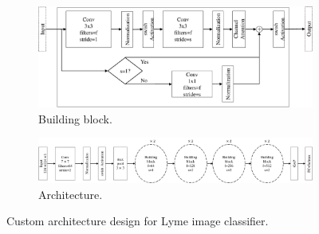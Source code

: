 \begin{figure}[htb!]
	\centering
	\begin{subfigure}[b]{\textwidth}
		\centering
		\includegraphics[width=\textwidth,keepaspectratio]{images/ongoing/building_block-cropped.pdf}
		\caption{Building block.}
		\label{fig:custom_block}
	\end{subfigure}
	\hfill
	\begin{subfigure}[b]{\textwidth}
		\centering
		\includegraphics[width=\textwidth,keepaspectratio]{images/ongoing/custom_archi-cropped.pdf}
		\caption{Architecture.}
		\label{fig:custom_arch}
	\end{subfigure}
	
	\caption{Custom architecture design for Lyme image classifier.}
	\label{fig:custom_arch_comb}
\end{figure}
%
